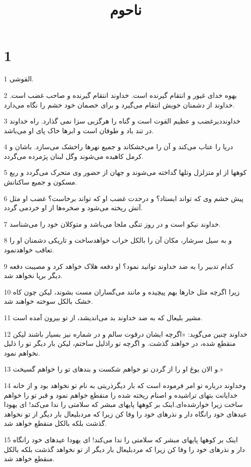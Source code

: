 

\title{ناحوم}


\chapter{1}

\par 1 القوشی.
\par 2 یهوه خدای غیور و انتقام گیرنده است. خداوند انتقام گیرنده و صاحب غضب است. خداوند از دشمنان خویش انتقام می‌گیرد و برای خصمان خود خشم را نگاه می‌دارد.
\par 3 خداونددیرغضب و عظیم القوت است و گناه را هرگزبی سزا نمی گذارد. راه خداوند در تند باد و طوفان است و ابرها خاک پای او می‌باشد.
\par 4 دریا را عتاب می‌کند و آن را می‌خشکاند و جمیع نهرها راخشک می‌سازد. باشان و کرمل کاهیده می‌شوند وگل لبنان پژمرده می‌گردد.
\par 5 کوهها از او متزلزل وتلها گداخته می‌شوند و جهان از حضور وی متحرک می‌گردد و ربع مسکون و جمیع ساکنانش.
\par 6 پیش خشم وی که تواند ایستاد؟ و درحدت غضب او که تواند برخاست؟ غضب او مثل آتش ریخته می‌شود و صخره‌ها از او خردمی گردد.
\par 7 خداوند نیکو است و در روز تنگی ملجا می‌باشد و متوکلان خود را می‌شناسد.
\par 8 و به سیل سرشار، مکان آن را بالکل خراب خواهدساخت و تاریکی دشمنان او را تعاقب خواهدنمود.
\par 9 کدام تدبیر را به ضد خداوند توانید نمود؟ او دفعه هلاک خواهد کرد و مصیبت دفعه دیگر برپا نخواهد شد.
\par 10 زیرا اگرچه مثل خارها بهم پیچیده و مانند می‌گساران مست بشوند، لیکن چون کاه خشک بالکل سوخته خواهند شد.
\par 11 مشیر بلیعال که به ضد خداوند بد می‌اندیشد، از تو بیرون آمده است.
\par 12 خداوند چنین می‌گوید: «اگرچه ایشان درقوت سالم و در شماره نیز بسیار باشند لیکن منقطع شده، در خواهند گذشت. و اگر‌چه تو راذلیل ساختم، لیکن بار دیگر تو را ذلیل نخواهم نمود.
\par 13 و الان یوغ او را از گردن تو خواهم شکست و بندهای تو را خواهم گسیخت.»
\par 14 وخداوند درباره تو امر فرموده است که بار دیگرذریتی به نام تو نخواهد بود و از خانه خدایانت بتهای تراشیده و اصنام ریخته شده را منقطع خواهم نمود و قبر تو را خواهم ساخت زیرا خوارشده‌ای.اینک بر کوهها پایهای مبشر که سلامتی را ندا می‌کند! ای یهودا عیدهای خود رانگاه دار و نذرهای خود را وفا کن زیرا که مردبلیعال بار دیگر از تو نخواهد گذشت بلکه بالکل منقطع خواهد شد.
\par 15 اینک بر کوهها پایهای مبشر که سلامتی را ندا می‌کند! ای یهودا عیدهای خود رانگاه دار و نذرهای خود را وفا کن زیرا که مردبلیعال بار دیگر از تو نخواهد گذشت بلکه بالکل منقطع خواهد شد.

